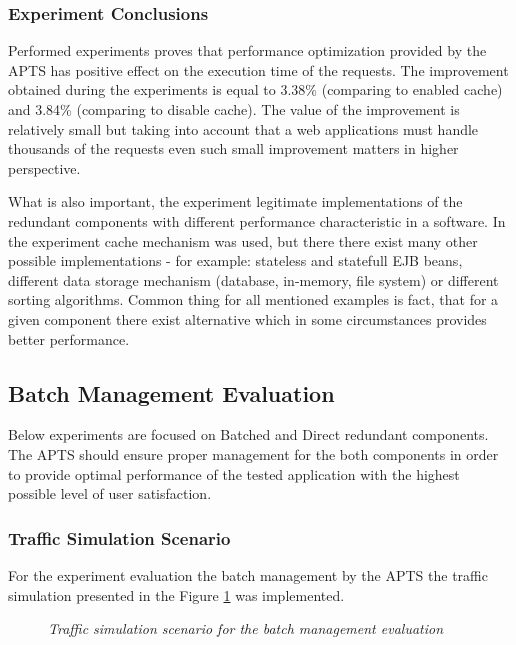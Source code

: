 \documentclass[12pt,a4paper]{article}
\begin{document}
\subsubsection{Experiment Conclusions} 


Performed experiments proves that performance optimization provided by the APTS has positive effect on the execution time of the requests. The improvement obtained during the experiments is equal to 3.38\% (comparing to enabled cache) and 3.84\% (comparing to disable cache). The value of the improvement is relatively small but taking into account that a web applications must handle thousands of the requests even such small improvement matters in higher perspective.  

What is also important, the experiment legitimate implementations of the redundant components with different performance characteristic in a software. In the experiment cache mechanism was used, but there there exist many other possible implementations - for example: stateless and statefull EJB beans, different data storage mechanism (database, in-memory, file system) or different sorting algorithms. Common thing for all mentioned examples is fact, that for a given component there exist alternative which in some circumstances provides better performance.     

 

\subsection{Batch Management Evaluation}

Below experiments  are focused on Batched and Direct redundant components. The APTS should ensure proper management for the both components in order to provide optimal performance of the tested application with the highest possible level of user satisfaction.  

\subsubsection{Traffic Simulation Scenario} \label{batchsimulationscenario}

For the experiment evaluation the batch management by the APTS the traffic simulation presented in the Figure \ref{trafficbatch} was implemented.

\begin{figure}[!htb]
\caption{\textit{Traffic simulation scenario for the batch management evaluation}} \label{trafficbatch}
\end{figure}
\end{document}
